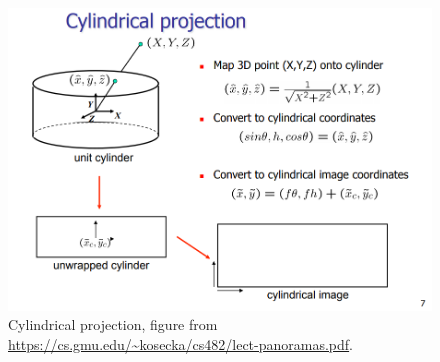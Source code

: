 \documentclass[a4paper]{article}
\begin{document}
\begin{figure}[!b]
	\centering
	\includegraphics[scale=0.5]{figures/cylin_proj.png}
	\caption{Cylindrical projection, figure from \url{https://cs.gmu.edu/~kosecka/cs482/lect-panoramas.pdf}.}
	\label{fig2}
\end{figure}
\end{document}
